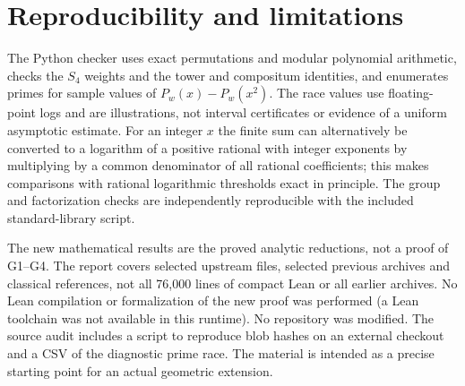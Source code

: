 \documentclass[11pt]{article}
\theoremstyle{remark}\newtheorem{remark}[theorem]{Remark}
\begin{document}
\section{Reproducibility and limitations}
The Python checker uses exact permutations and modular polynomial arithmetic, checks the $S_4$ weights and the tower and compositum identities, and enumerates primes for sample values of $P_w(x)-P_w(x^2)$. The race values use floating-point logs and are illustrations, not interval certificates or evidence of a uniform asymptotic estimate. For an integer $x$ the finite sum can alternatively be converted to a logarithm of a positive rational with integer exponents by multiplying by a common denominator of all rational coefficients; this makes comparisons with rational logarithmic thresholds exact in principle. The group and factorization checks are independently reproducible with the included standard-library script.

The new mathematical results are the proved analytic reductions, not a proof of G1--G4. The report covers selected upstream files, selected previous archives and classical references, not all 76,000 lines of compact Lean or all earlier archives. No Lean compilation or formalization of the new proof was performed (a Lean toolchain was not available in this runtime). No repository was modified. The source audit includes a script to reproduce blob hashes on an external checkout and a CSV of the diagnostic prime race. The material is intended as a precise starting point for an actual geometric extension.
\end{document}
